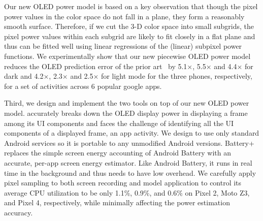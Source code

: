 Our new OLED power model is based on a key observation that though the
pixel power values in the color space do not fall in a plane,
they form a reasonably smooth surface.  Therefore, if we cut
the 3-D color space into small subgrids, the pixel power values within
each subgrid are likely to fit closely in a flat plane and thus can be
fitted well using linear regressions of the (linear) subpixel power
functions. We experimentally show that our new piecewise OLED power model reduces the
OLED prediction error of the prior art~\cite{park2015accurate} by
5.1$\times$, 5.5$\times$ and 4.4$\times$ for dark
and 4.2$\times$, 2.3$\times$ and 2.5$\times$ for light mode for the three phones,
respectively, for a set of activities across 6 popular google apps.



Third, we design and implement the two tools on top of our new OLED
power model. \name accurately breaks down the OLED display power in
displaying a frame among its UI components and faces the challenge of
identifying all the UI components of a displayed frame, \eg an app
activity.
We design \name to use only standard Android services so
it is portable to any unmodified Android versions.
Battery+ replaces
the simple screen energy accounting of Android Battery with an
accurate, per-app screen energy estimator.  Like Android
Battery, it runs in real time in the background and thus needs to have low
overhead. We carefully apply pixel sampling to both screen recording
and model application to control its average CPU utilization to be
only 1.1\%, 0.9\%, and 0.6\% on Pixel 2, Moto Z3, and Pixel 4, respectively,
while minimally affecting the power estimation accuracy.


